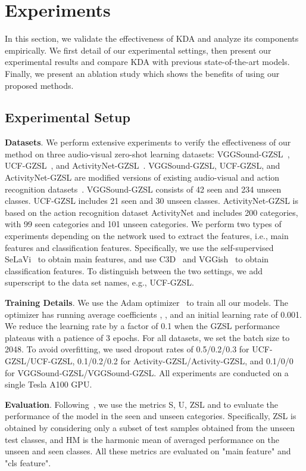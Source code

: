 \documentclass[10pt,twocolumn,letterpaper]{article}
\begin{document}
\section{Experiments}
In this section, we validate the effectiveness of KDA and analyze its components empirically. We first detail of our experimental settings, then present our experimental results and compare KDA with previous state-of-the-art models. Finally, we present an ablation study which shows the benefits of using our proposed methods.

\subsection{Experimental Setup}

\textbf{Datasets}. We perform extensive experiments to verify the effectiveness of our method on three audio-visual zero-shot learning datasets: VGGSound-GZSL~\cite{AVCA}, UCF-GZSL~\cite{AVCA}, and ActivityNet-GZSL~\cite{AVCA}. 
VGGSound-GZSL, UCF-GZSL, and ActivityNet-GZSL are modified versions of existing audio-visual and action recognition datasets~\cite{Vggsound,UCF101,Activitynet}. VGGSound-GZSL consists of 42 seen and 234 unseen classes. UCF-GZSL includes 21 seen and 30 unseen classes. ActivityNet-GZSL is based on the action recognition dataset ActivityNet and includes 200 categories, with 99 seen categories and 101 unseen categories.
We perform two types of experiments depending on the network used to extract the features, i.e., main features and classification features.
Specifically, we use the self-supervised SeLaVi~\cite{Asano_Patrick_Rupprecht_Vedaldi_2020} to obtain main features, and use C3D~\cite{C3D} and VGGish~\cite{Vggish} to obtain classification features.
To distinguish between the two settings, we add superscript  to the data set names, e.g., UCF-GZSL.

\noindent
\textbf{Training Details}.
We use the Adam optimizer~\cite{adam} to train all our models. The optimizer has running average coefficients , , and an initial learning rate of 0.001. We reduce the learning rate by a factor of 0.1 when the GZSL performance plateaus with a patience of 3 epochs. For all datasets, we set the batch size to 2048.
To avoid overfitting, we used dropout rates  of 0.5/0.2/0.3 for UCF-GZSL/UCF-GZSL, 0.1/0.2/0.2 for Activity-GZSL/Activity-GZSL, and 0.1/0/0 for VGGSound-GZSL/VGGSound-GZSL.
All experiments are conducted on a single Tesla A100 GPU.

\noindent
\textbf{Evaluation}.
Following~\cite{AVCA}, we use the metrics S, U, ZSL and  to evaluate the performance of the model in the seen and unseen categories. Specifically, ZSL is obtained by considering only a subset of test samples obtained from the unseen test classes, and HM is the harmonic mean of averaged performance on the unseen and seen classes. All these metrics are evaluated on "main feature" and "cls feature".
\end{document}

